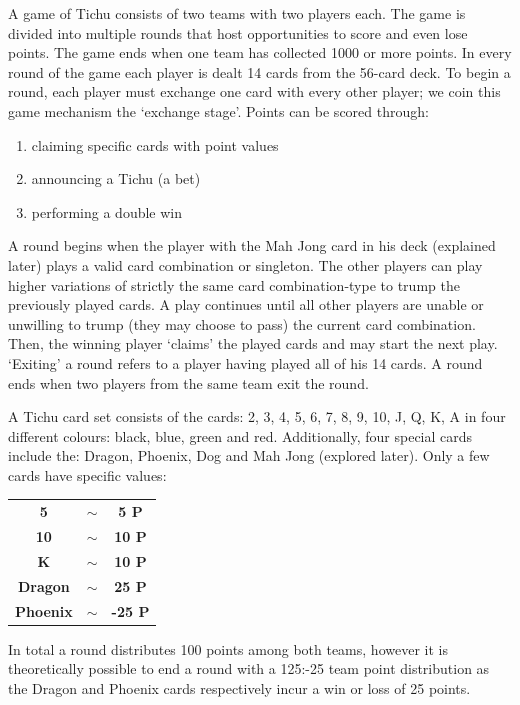 A game of Tichu consists of two teams with two players each. The game is divided into multiple rounds that host opportunities to score and even lose points. The game ends when one team has collected 1000 or more points. In every round of the game each player is dealt 14 cards from the 56-card deck. To begin a round, each player must exchange one card with every other player; we coin this game mechanism the ‘exchange stage’. Points can be scored through:
\begin{enumerate}
\item claiming specific cards with point values
\item announcing a Tichu (a bet)
\item performing a double win
\end{enumerate}

A round begins when the player with the Mah Jong card in his deck (explained later) plays a valid card combination or singleton. The other players can play higher variations of strictly the same card combination-type to trump the previously played cards. A play continues until all other players are unable or unwilling to trump (they may choose to pass) the current card combination. Then, the winning player ‘claims’ the played cards and may start the next play. ‘Exiting’ a round refers to a player having played all of his 14 cards. A round ends when two players from the same team exit the round.


A Tichu card set consists of the cards: 2, 3, 4, 5, 6, 7, 8, 9, 10, J, Q, K, A in four different colours: black, blue, green and red. Additionally, four special cards include the: Dragon, Phoenix, Dog and Mah Jong (explored later). Only a few cards have specific values:\\
\begin{scriptsize}
\begin{center}
\begin{tabular}{ c c c }
\textbf{5} & $\sim$  & \textbf{5 P} \\
\textbf{10} & $\sim$ & \textbf{10 P} \\
\textbf{K} & $\sim$  & \textbf{10 P} \\
\textbf{Dragon} & $\sim$ & \textbf{25 P} \\
\textbf{Phoenix} & $\sim$ & \textbf{-25 P}
\end{tabular}
\end{center}
\end{scriptsize}
In total a round distributes 100 points among both teams, however it is theoretically possible to end a round with a 125:-25 team point distribution as the Dragon and Phoenix cards respectively incur a win or loss of 25 points.

